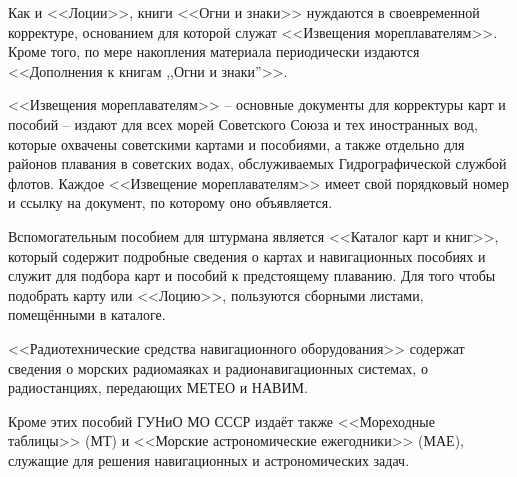 Как и <<Лоции>>, книги <<Огни и знаки>> нуждаются в своевременной
корректуре, основанием для которой служат <<Извещения
мореплавателям>>. Кроме того, по мере накопления материала
периодически издаются <<Дополнения к книгам ,,Огни и знаки''>>.

<<Извещения мореплавателям>> \--- основные документы для корректуры
карт и пособий \--- издают для всех морей Советского Союза и тех
иностранных вод, которые охвачены советскими картами и пособиями, а
также отдельно для районов плавания в советских водах, обслуживаемых
Гидрографической службой флотов. Каждое <<Извещение мореплавателям>>
имеет свой порядковый номер и ссылку на документ, по которому оно
объявляется.

Вспомогательным пособием для штурмана является <<Каталог карт и
книг>>, который содержит подробные сведения о картах и навигационных
пособиях и служит для подбора карт и пособий к предстоящему
плаванию. Для того чтобы подобрать карту или <<Лоцию>>, пользуются
сборными листами, помещёнными в каталоге.

<<Радиотехнические средства навигационного оборудования>> содержат
сведения о морских радиомаяках и радионавигационных системах, о
радиостанциях, передающих МЕТЕО и НАВИМ.

Кроме этих пособий ГУНиО МО СССР издаёт также <<Мореходные таблицы>>
(МТ) и <<Морские астрономические ежегодники>> (МАЕ), служащие для
решения навигационных и астрономических задач.

\onecolumn


